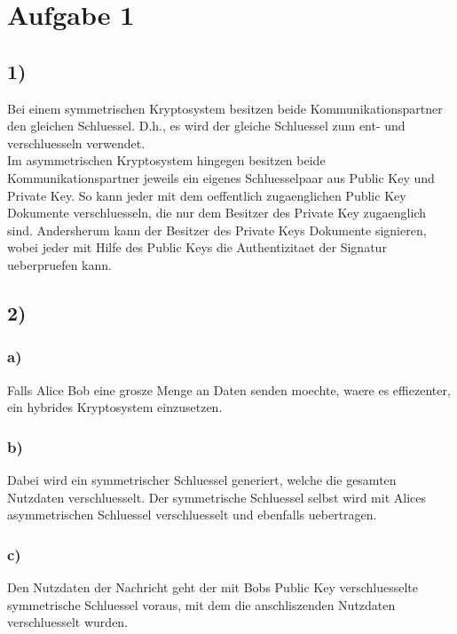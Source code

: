 \documentclass[a4paper,11pt,parskip=half]{scrartcl}
\title{\titleinfo}
\author{\authorinfo}
\date{\today}
\begin{document}
\maketitle

\section*{Aufgabe 1}
\subsection*{1)}
Bei einem symmetrischen Kryptosystem besitzen beide 
Kommunikationspartner den gleichen Schluessel. D.h., es wird
der gleiche Schluessel zum ent- und verschluesseln verwendet.
\\
Im asymmetrischen Kryptosystem hingegen besitzen beide 
Kommunikationspartner jeweils ein eigenes Schluesselpaar aus
Public Key und Private Key. So kann jeder mit dem oeffentlich
zugaenglichen Public Key Dokumente verschluesseln, die nur dem
Besitzer des Private Key zugaenglich sind. Andersherum kann der
Besitzer des Private Keys Dokumente signieren, wobei jeder
mit Hilfe des Public Keys die Authentizitaet der Signatur
ueberpruefen kann.

\subsection*{2)}
\subsubsection*{a)}
Falls Alice Bob eine grosze Menge an Daten senden moechte,
waere es effiezenter, ein hybrides Kryptosystem einzusetzen.

\subsubsection*{b)}
Dabei wird ein symmetrischer Schluessel generiert, welche die
gesamten Nutzdaten verschluesselt. Der symmetrische Schluessel
selbst wird mit Alices asymmetrischen Schluessel verschluesselt
und ebenfalls uebertragen.

\subsubsection*{c)}
Den Nutzdaten der Nachricht geht der mit Bobs Public Key
verschluesselte symmetrische Schluessel voraus, mit dem die
anschliszenden Nutzdaten verschluesselt wurden.
\end{document}
